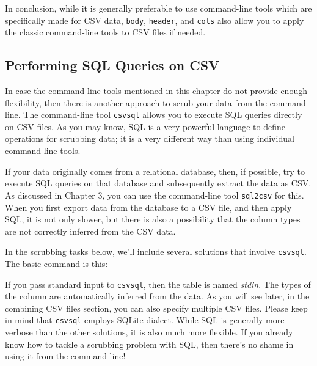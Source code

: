 \documentclass[
]{book}
\newenvironment{Shaded}{\begin{snugshade}}{\end{snugshade}}
\newcommand{\ExtensionTok}[1]{#1}
\newcommand{\FunctionTok}[1]{\textcolor[rgb]{0.00,0.00,0.00}{#1}}
\newcommand{\KeywordTok}[1]{\textcolor[rgb]{0.13,0.29,0.53}{\textbf{#1}}}
\newcommand{\NormalTok}[1]{#1}
\newcommand{\StringTok}[1]{\textcolor[rgb]{0.31,0.60,0.02}{#1}}
\theoremstyle{definition}
\theoremstyle{definition}
\theoremstyle{definition}
\theoremstyle{remark}
\begin{document}
In conclusion, while it is generally preferable to use command-line tools which are specifically made for CSV data, \texttt{body}, \texttt{header}, and \texttt{cols} also allow you to apply the classic command-line tools to CSV files if needed.

\hypertarget{performing-sql-queries-on-csv}{%
\subsection{Performing SQL Queries on CSV}\label{performing-sql-queries-on-csv}}

In case the command-line tools mentioned in this chapter do not provide enough flexibility, then there is another approach to scrub your data from the command line. The command-line tool \texttt{csvsql} \citep{csvsql} allows you to execute SQL queries directly on CSV files. As you may know, SQL is a very powerful language to define operations for scrubbing data; it is a very different way than using individual command-line tools.

\begin{rmdnote}
If your data originally comes from a relational database, then, if possible, try to execute SQL queries on that database and subsequently extract the data as CSV. As discussed in Chapter 3, you can use the command-line tool \texttt{sql2csv} for this. When you first export data from the database to a CSV file, and then apply SQL, it is not only slower, but there is also a possibility that the column types are not correctly inferred from the CSV data.
\end{rmdnote}

In the scrubbing tasks below, we'll include several solutions that involve \texttt{csvsql}. The basic command is this:

\begin{Shaded}
\end{Shaded}

If you pass standard input to \texttt{csvsql}, then the table is named \emph{stdin}. The types of the column are automatically inferred from the data. As you will see later, in the combining CSV files section, you can also specify multiple CSV files. Please keep in mind that \texttt{csvsql} employs SQLite dialect. While SQL is generally more verbose than the other solutions, it is also much more flexible. If you already know how to tackle a scrubbing problem with SQL, then there's no shame in using it from the command line!
\end{document}
